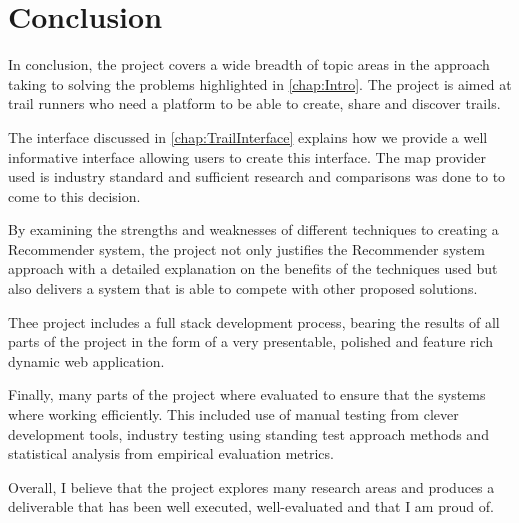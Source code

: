 \chapter{Conclusion}
In conclusion, the project covers a wide breadth of topic areas in the approach taking to solving the problems highlighted in \autoref{chap:Intro}. The project is aimed at trail runners who need a platform to be able to create, share and discover trails.

The interface discussed in \autoref{chap:TrailInterface} explains how we provide a well informative interface allowing users to create this interface. The map provider used is industry standard and sufficient research and comparisons was done to to come to this decision.

By examining the strengths and weaknesses of different techniques to creating a Recommender system, the project not only justifies the Recommender system approach with a detailed explanation on the benefits of the techniques used but also delivers a system that is able to compete with other proposed solutions. 

Thee project includes a full stack development process, bearing the results of all parts of the project in the form of a very presentable, polished and feature rich dynamic web application.

Finally, many parts of the project where evaluated to ensure that the systems where working efficiently. This included use of manual testing from clever development tools, industry testing using standing test approach methods and statistical analysis from empirical evaluation metrics. 

Overall, I believe that the project explores many research areas and produces a deliverable that has been well executed, well-evaluated and that I am proud of.